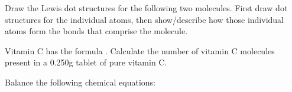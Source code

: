\documentclass[addpoints, 12pt]{exam}
\begin{document}
\begin{questions}

\question[10] Draw the Lewis dot structures for the following two
molecules.  First draw dot structures for the individual atoms, then
show/describe how those individual atoms form the bonds that comprise
the molecule.


\question[10] Vitamin C has the formula . Calculate the number
of vitamin C molecules present in a 0.250g tablet of pure vitamin C.
\vspace{3cm}

\question[20] Balance the following chemical equations: 


\end{questions}
\end{document}
